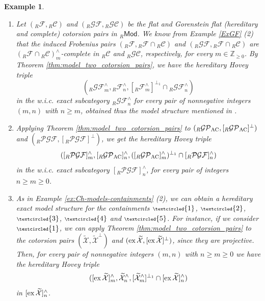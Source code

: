 \documentclass[10pt,reqno]{amsart}
\numberwithin{equation}{section}
\newtheorem{example}[definition]{Example}
\theoremstyle{remark}
\newcommand{\X}{\mathcal{X}}
\begin{document}
\begin{example}\label{ex:method4} ~\
\begin{enumerate}[(1)]
\item Let $({}_R\mathcal{F},{}_R\mathcal{C})$ and $({}_R\mathcal{GF},{}_R\mathcal{GC})$ be the flat and Gorenstein flat (hereditary and complete) cotorsion pairs in ${}_R\mathsf{Mod}$. We know from Example \ref{ExGF} (2) that the induced Frobenius pairs $({}_R\mathcal{F},{}_R\mathcal{F} \cap {}_R\mathcal{C})$ and $({}_R\mathcal{GF},{}_R\mathcal{F} \cap {}_R\mathcal{C})$ are $({}_R\mathcal{F} \cap {}_R\mathcal{C})^\wedge_m$-complete in ${}_R\mathcal{C}$ and ${}_R\mathcal{GC}$, respectively, for every $m \in \mathbb{Z}_{\geq 0}$. By Theorem \ref{thm:model_two_cotorsion_pairs}, we have the hereditary Hovey triple
\[
({}_R\mathcal{GF}^\wedge_m, {}_R\mathcal{F}^\wedge_n, [{}_R\mathcal{F}^\wedge_m]^{\perp_1} \cap {}_R\mathcal{GF}^\wedge_n)
\]
in the w.i.c. exact subcategory ${}_R\mathcal{GF}^\wedge_n$ for every pair of nonnegative integers $(m,n)$ with $n \geq m$, obtained thus the model structure mentioned in \cite[Coroll. 7.7.]{Chains}.


\item Applying Theorem \ref{thm:model_two_cotorsion_pairs} to $({}_R\mathcal{GP}_{\rm AC},[{}_R\mathcal{GP}_{\rm AC}]^\perp)$ and $({}_R\mathcal{PGF},[{}_R\mathcal{PGF}]^\perp)$, we get the hereditary Hovey triple 
\[
([{}_R\mathcal{PGF}]^\wedge_m, [{}_R\mathcal{GP}_{\rm AC}]^\wedge_n, ([{}_R\mathcal{GP}_{\rm AC}]^\wedge_m)^{\perp_1} \cap [{}_R\mathcal{PGF}]^\wedge_n)
\] 
in the w.i.c. exact subcategory $[{}_R\mathcal{PGF}]^\wedge_n$, for every pair of integers $n \geq m \geq 0$.


\item As in Example \ref{ex:Ch-models-containments} (2), we can obtain a hereditary exact model structure for the containments ${\scriptsize\textcircled{1}}$, ${\scriptsize\textcircled{2}}$, ${\scriptsize\textcircled{3}}$, ${\scriptsize\textcircled{4}}$ and ${\scriptsize\textcircled{5}}$. For instance, if we consider ${\scriptsize\textcircled{1}}$, we can apply Theorem \ref{thm:model_two_cotorsion_pairs} to the cotorsion pairs $(\widetilde{\X},\widetilde{\X}^\perp)$ and $({\rm ex}\,\widetilde{\X},[{\rm ex}\,\widetilde{\X}]^\perp)$, since they are projective. Then, for every pair of nonnegative integers $(m,n)$ with $n \geq m \geq 0$ we have the hereditary Hovey triple
\[
([{\rm ex}\,\widetilde{\X}]^\wedge_m, \widetilde{\X}^\wedge_n, [\widetilde{\X}^\wedge_m]^{\perp_1} \cap [{\rm ex}\,\widetilde{\X}]^\wedge_n)
\] 
in $[{\rm ex}\,\widetilde{\X}]^\wedge_n$. 
\end{enumerate}
\end{example}
\end{document}

